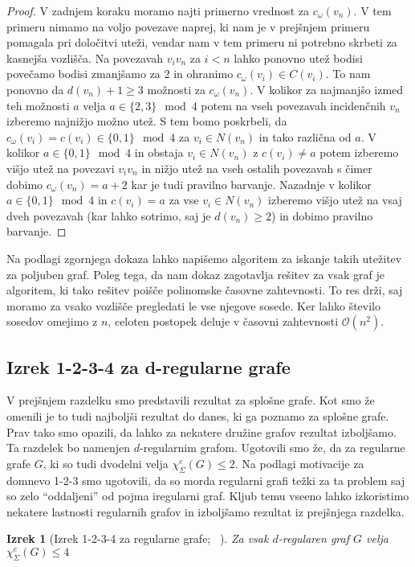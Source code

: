 \documentclass[12pt,a4paper,twoside]{article}
\theoremstyle{definition} %
\theoremstyle{plain} %
\newtheorem{izrek}[definicija]{Izrek}
\newcommand{\ec}{\chi_{\Sigma}^e}
\numberwithin{equation}{section}  %
\begin{document}
\begin{proof}
V zadnjem koraku moramo najti primerno vrednost za $c_{\omega}(v_n)$. V tem primeru nimamo na voljo povezave naprej, ki nam je v prejšnjem primeru pomagala pri določitvi uteži, vendar nam v tem primeru ni potrebno skrbeti za kasnejša vozlišča. Na povezavah $v_iv_n$ za $i < n$ lahko ponovno utež bodisi povečamo bodisi zmanjšamo za 2 in ohranimo $c_{\omega}(v_i) \in C(v_i)$. To nam ponovno da $d(v_n) + 1 \ge 3$ možnosti za $c_{\omega}(v_n)$. V kolikor za najmanjšo izmed teh možnosti $a$ velja $a \in \{2,3\} \mod 4$ potem na vseh povezavah incidenčnih $v_n$ izberemo najnižjo možno utež. S tem bomo poskrbeli, da $c_{\omega}(v_i) = c(v_i) \in \{0,1\} \mod 4$ za $v_i \in N(v_n)$ in tako različna od $a$. V kolikor $a \in \{0,1\} \mod 4$ in obstaja $v_i \in N(v_n)$ z $c(v_i) \neq a$ potem izberemo višjo utež na povezavi $v_iv_n$ in nižjo utež na vseh ostalih povezavah s čimer dobimo $c_{\omega}(v_n) = a + 2$ kar je tudi pravilno barvanje. Nazadnje v kolikor $a \in \{0, 1\} \mod 4$ in $c(v_i) = a$ za vse $v_i \in N(v_n)$ izberemo višjo utež na vsaj dveh povezavah (kar lahko sotrimo, saj je $d(v_n) \ge 2$) in dobimo pravilno barvanje.
\end{proof}

Na podlagi zgornjega dokaza lahko napišemo algoritem za iskanje takih utežitev za poljuben graf. Poleg tega, da nam dokaz zagotavlja rešitev za vsak graf je algoritem, ki tako rešitev poišče polinomske časovne zahtevnosti. To res drži, saj moramo za vsako vozlišče pregledati le vse njegove sosede. Ker lahko število sosedov omejimo z $n$, celoten postopek deluje v časovni zahtevnosti $\mathcal{O}(n^2)$.

\subsection{Izrek 1-2-3-4 za d-regularne grafe}

V prejšnjem razdelku smo predstavili rezultat za splošne grafe. Kot smo že omenili je to tudi najboljši rezultat do danes, ki ga poznamo za splošne grafe. Prav tako smo opazili, da lahko za nekatere družine grafov rezultat izboljšamo. Ta razdelek bo namenjen $d$-regularnim grafom. Ugotovili smo že, da za regularne grafe $G$, ki so tudi dvodelni velja $\ec(G) \le 2$. Na podlagi motivacije za domnevo 1-2-3 smo ugotovili, da so morda regularni grafi težki za ta problem saj so zelo ``oddaljeni''  od pojma iregularni graf. Kljub temu vseeno lahko izkoristimo nekatere lastnosti regularnih grafov in izboljšamo rezultat iz prejšnjega razdelka.
\begin{izrek}[Izrek 1-2-3-4 za regularne grafe; ~\citet{regular}]
Za vsak $d$-regularen graf $G$ velja $\ec(G) \le 4$
\end{izrek}
\end{document}
